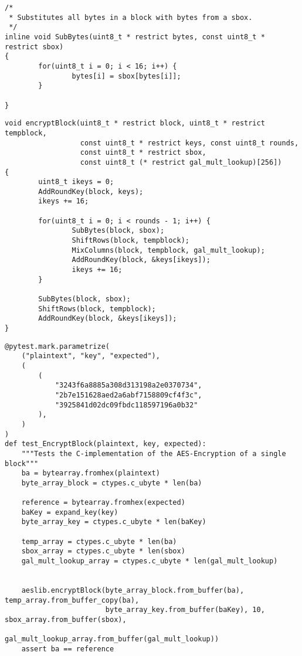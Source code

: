 \begin{lstlisting}
/*
 * Substitutes all bytes in a block with bytes from a sbox.
 */
inline void SubBytes(uint8_t * restrict bytes, const uint8_t * restrict sbox)
{
        for(uint8_t i = 0; i < 16; i++) {
                bytes[i] = sbox[bytes[i]];
        }
    
}
\end{lstlisting}

\begin{lstlisting}
void encryptBlock(uint8_t * restrict block, uint8_t * restrict tempblock, 
                  const uint8_t * restrict keys, const uint8_t rounds, 
                  const uint8_t * restrict sbox, 
                  const uint8_t (* restrict gal_mult_lookup)[256])
{   
        uint8_t ikeys = 0;
        AddRoundKey(block, keys);
        ikeys += 16;

        for(uint8_t i = 0; i < rounds - 1; i++) {   
                SubBytes(block, sbox);
                ShiftRows(block, tempblock);
                MixColumns(block, tempblock, gal_mult_lookup);
                AddRoundKey(block, &keys[ikeys]);
                ikeys += 16;
        }
        
        SubBytes(block, sbox);
        ShiftRows(block, tempblock);
        AddRoundKey(block, &keys[ikeys]);
}
\end{lstlisting}

\begin{lstlisting}
@pytest.mark.parametrize(
    ("plaintext", "key", "expected"),
    (
        (
            "3243f6a8885a308d313198a2e0370734",
            "2b7e151628aed2a6abf7158809cf4f3c",
            "3925841d02dc09fbdc118597196a0b32"
        ),
    )
)
def test_EncryptBlock(plaintext, key, expected):
    """Tests the C-implementation of the AES-Encryption of a single block"""
    ba = bytearray.fromhex(plaintext)
    byte_array_block = ctypes.c_ubyte * len(ba)

    reference = bytearray.fromhex(expected)
    baKey = expand_key(key)
    byte_array_key = ctypes.c_ubyte * len(baKey)

    temp_array = ctypes.c_ubyte * len(ba)
    sbox_array = ctypes.c_ubyte * len(sbox)
    gal_mult_lookup_array = ctypes.c_ubyte * len(gal_mult_lookup)
    

    aeslib.encryptBlock(byte_array_block.from_buffer(ba), temp_array.from_buffer_copy(ba),
                        byte_array_key.from_buffer(baKey), 10, sbox_array.from_buffer(sbox),
                        gal_mult_lookup_array.from_buffer(gal_mult_lookup))
    assert ba == reference
\end{lstlisting}


